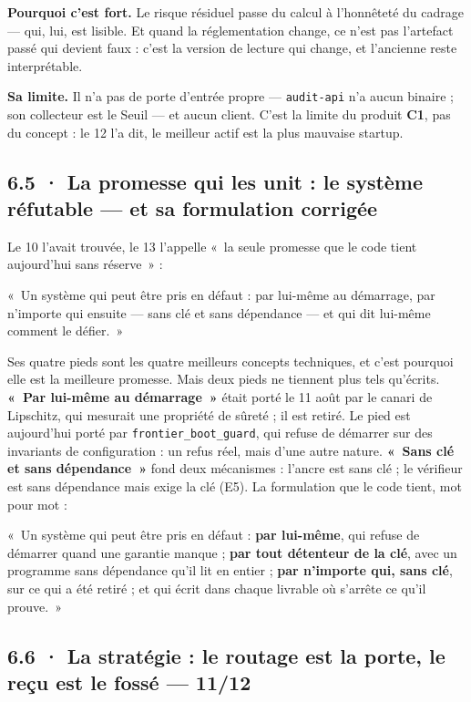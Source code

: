 \documentclass[10pt]{article}
\newcommand{\code}[1]{\texttt{\small #1}}
\newcommand{\cun}{\textcolor{c1col}{\textbf{C1}}}
\begin{document}
\textbf{Pourquoi c'est fort.} Le risque résiduel passe du calcul à l'honnêteté du cadrage --- qui, lui, est lisible. Et
quand la réglementation change, ce n'est pas l'artefact passé qui devient faux : c'est la version de lecture qui
change, et l'ancienne reste interprétable.

\textbf{Sa limite.} Il n'a pas de porte d'entrée propre --- \code{audit-api} n'a aucun binaire ; son collecteur est le
Seuil --- et aucun client. C'est la limite du produit \cun{}, pas du concept : le 12 l'a dit, le meilleur actif est la
plus mauvaise startup.

\subsection{6.5 · La promesse qui les unit : le système réfutable --- et sa formulation corrigée}

Le 10 l'avait trouvée, le 13 l'appelle «~la seule promesse que le code tient aujourd'hui sans réserve~» :

\begin{extrait}
«~Un système qui peut être pris en défaut : par lui-même au démarrage, par n'importe qui ensuite --- sans clé et
sans dépendance --- et qui dit lui-même comment le défier.~»
\end{extrait}

Ses quatre pieds sont les quatre meilleurs concepts techniques, et c'est pourquoi elle est la meilleure promesse. Mais
deux pieds ne tiennent plus tels qu'écrits. \textbf{«~Par lui-même au démarrage~»} était porté le 11 août par le
canari de Lipschitz, qui mesurait une propriété de sûreté ; il est retiré. Le pied est aujourd'hui porté par
\code{frontier\_boot\_guard}, qui refuse de démarrer sur des invariants de configuration : un refus réel, mais d'une
autre nature. \textbf{«~Sans clé et sans dépendance~»} fond deux mécanismes : l'ancre est sans clé ; le vérifieur est
sans dépendance mais exige la clé (E5). La formulation que le code tient, mot pour mot :

\begin{acquis}
«~Un système qui peut être pris en défaut : \textbf{par lui-même}, qui refuse de démarrer quand une garantie manque ;
\textbf{par tout détenteur de la clé}, avec un programme sans dépendance qu'il lit en entier ; \textbf{par n'importe
qui, sans clé}, sur ce qui a été retiré ; et qui écrit dans chaque livrable où s'arrête ce qu'il prouve.~»
\end{acquis}

\subsection{6.6 · La stratégie : le routage est la porte, le reçu est le fossé --- 11/12}
\end{document}
